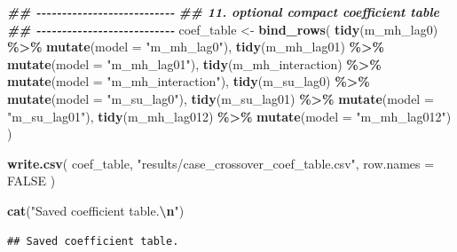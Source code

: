\documentclass[
]{article}
\newenvironment{Shaded}{\begin{snugshade}}{\end{snugshade}}
\newcommand{\AttributeTok}[1]{\textcolor[rgb]{0.13,0.29,0.53}{#1}}
\newcommand{\ConstantTok}[1]{\textcolor[rgb]{0.56,0.35,0.01}{#1}}
\newcommand{\DocumentationTok}[1]{\textcolor[rgb]{0.56,0.35,0.01}{\textbf{\textit{#1}}}}
\newcommand{\FunctionTok}[1]{\textcolor[rgb]{0.13,0.29,0.53}{\textbf{#1}}}
\newcommand{\NormalTok}[1]{#1}
\newcommand{\OtherTok}[1]{\textcolor[rgb]{0.56,0.35,0.01}{#1}}
\newcommand{\SpecialCharTok}[1]{\textcolor[rgb]{0.81,0.36,0.00}{\textbf{#1}}}
\newcommand{\StringTok}[1]{\textcolor[rgb]{0.31,0.60,0.02}{#1}}
\begin{document}
\begin{Shaded}
\begin{Highlighting}[]
\DocumentationTok{\#\# {-}{-}{-}{-}{-}{-}{-}{-}{-}{-}{-}{-}{-}{-}{-}{-}{-}{-}{-}{-}{-}{-}{-}{-}{-}{-}{-}}
\DocumentationTok{\#\# 11. optional compact coefficient table}
\DocumentationTok{\#\# {-}{-}{-}{-}{-}{-}{-}{-}{-}{-}{-}{-}{-}{-}{-}{-}{-}{-}{-}{-}{-}{-}{-}{-}{-}{-}{-}}
\NormalTok{coef\_table }\OtherTok{\textless{}{-}} \FunctionTok{bind\_rows}\NormalTok{(}
  \FunctionTok{tidy}\NormalTok{(m\_mh\_lag0) }\SpecialCharTok{\%\textgreater{}\%} \FunctionTok{mutate}\NormalTok{(}\AttributeTok{model =} \StringTok{"m\_mh\_lag0"}\NormalTok{),}
  \FunctionTok{tidy}\NormalTok{(m\_mh\_lag01) }\SpecialCharTok{\%\textgreater{}\%} \FunctionTok{mutate}\NormalTok{(}\AttributeTok{model =} \StringTok{"m\_mh\_lag01"}\NormalTok{),}
  \FunctionTok{tidy}\NormalTok{(m\_mh\_interaction) }\SpecialCharTok{\%\textgreater{}\%} \FunctionTok{mutate}\NormalTok{(}\AttributeTok{model =} \StringTok{"m\_mh\_interaction"}\NormalTok{),}
  \FunctionTok{tidy}\NormalTok{(m\_su\_lag0) }\SpecialCharTok{\%\textgreater{}\%} \FunctionTok{mutate}\NormalTok{(}\AttributeTok{model =} \StringTok{"m\_su\_lag0"}\NormalTok{),}
  \FunctionTok{tidy}\NormalTok{(m\_su\_lag01) }\SpecialCharTok{\%\textgreater{}\%} \FunctionTok{mutate}\NormalTok{(}\AttributeTok{model =} \StringTok{"m\_su\_lag01"}\NormalTok{),}
  \FunctionTok{tidy}\NormalTok{(m\_mh\_lag012) }\SpecialCharTok{\%\textgreater{}\%} \FunctionTok{mutate}\NormalTok{(}\AttributeTok{model =} \StringTok{"m\_mh\_lag012"}\NormalTok{)}
\NormalTok{)}

\FunctionTok{write.csv}\NormalTok{(}
\NormalTok{  coef\_table,}
  \StringTok{"results/case\_crossover\_coef\_table.csv"}\NormalTok{,}
  \AttributeTok{row.names =} \ConstantTok{FALSE}
\NormalTok{)}

\FunctionTok{cat}\NormalTok{(}\StringTok{"Saved coefficient table.}\SpecialCharTok{\textbackslash{}n}\StringTok{"}\NormalTok{)}
\end{Highlighting}
\end{Shaded}

\begin{verbatim}
## Saved coefficient table.
\end{verbatim}
\end{document}
